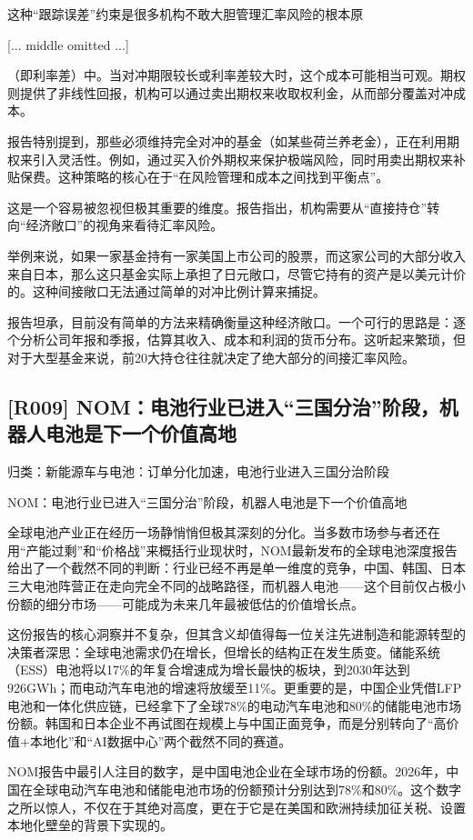 \documentclass[11pt]{ctexart}
\begin{document}
这种“跟踪误差”约束是很多机构不敢大胆管理汇率风险的根本原

[... middle omitted ...]

（即利率差）中。当对冲期限较长或利率差较大时，这个成本可能相当可观。期权则提供了非线性回报，机构可以通过卖出期权来收取权利金，从而部分覆盖对冲成本。

报告特别提到，那些必须维持完全对冲的基金（如某些荷兰养老金），正在利用期权来引入灵活性。例如，通过买入价外期权来保护极端风险，同时用卖出期权来补贴保费。这种策略的核心在于“在风险管理和成本之间找到平衡点”。

这是一个容易被忽视但极其重要的维度。报告指出，机构需要从“直接持仓”转向“经济敞口”的视角来看待汇率风险。

举例来说，如果一家基金持有一家美国上市公司的股票，而这家公司的大部分收入来自日本，那么这只基金实际上承担了日元敞口，尽管它持有的资产是以美元计价的。这种间接敞口无法通过简单的对冲比例计算来捕捉。

报告坦承，目前没有简单的方法来精确衡量这种经济敞口。一个可行的思路是：逐个分析公司年报和季报，估算其收入、成本和利润的货币分布。这听起来繁琐，但对于大型基金来说，前20大持仓往往就决定了绝大部分的间接汇率风险。

\subsection{[R009] NOM：电池行业已进入“三国分治”阶段，机器人电池是下一个价值高地}
{\small\color{refgray}归类：新能源车与电池：订单分化加速，电池行业进入三国分治阶段}

NOM：电池行业已进入“三国分治”阶段，机器人电池是下一个价值高地

全球电池产业正在经历一场静悄悄但极其深刻的分化。当多数市场参与者还在用“产能过剩”和“价格战”来概括行业现状时，NOM最新发布的全球电池深度报告给出了一个截然不同的判断：行业已经不再是单一维度的竞争，中国、韩国、日本三大电池阵营正在走向完全不同的战略路径，而机器人电池——这个目前仅占极小份额的细分市场——可能成为未来几年最被低估的价值增长点。

这份报告的核心洞察并不复杂，但其含义却值得每一位关注先进制造和能源转型的决策者深思：全球电池需求仍在增长，但增长的结构正在发生质变。储能系统（ESS）电池将以17\%的年复合增速成为增长最快的板块，到2030年达到926GWh；而电动汽车电池的增速将放缓至11\%。更重要的是，中国企业凭借LFP电池和一体化供应链，已经拿下了全球78\%的电动汽车电池和80\%的储能电池市场份额。韩国和日本企业不再试图在规模上与中国正面竞争，而是分别转向了“高价值+本地化”和“AI数据中心”两个截然不同的赛道。

NOM报告中最引人注目的数字，是中国电池企业在全球市场的份额。2026年，中国在全球电动汽车电池和储能电池市场的份额预计分别达到78\%和80\%。这个数字之所以惊人，不仅在于其绝对高度，更在于它是在美国和欧洲持续加征关税、设置本地化壁垒的背景下实现的。
\end{document}
